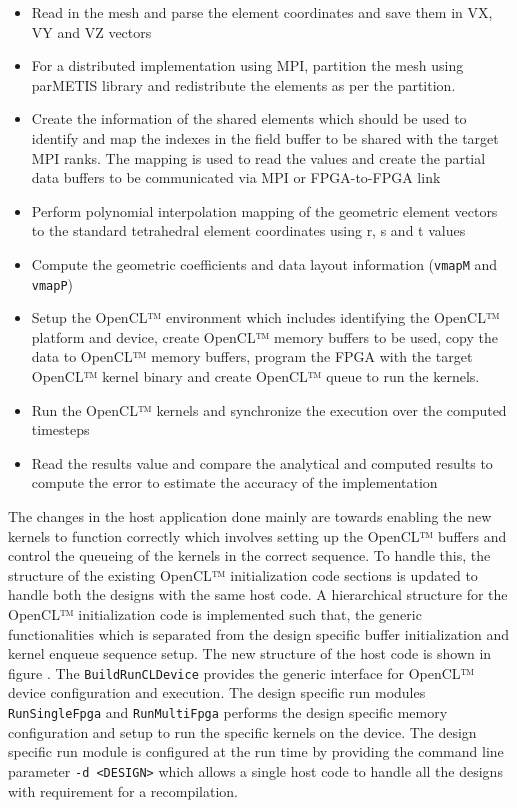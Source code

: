 \begin{itemize}
    \item Read in the mesh and parse the element coordinates and save them in VX, VY and VZ vectors
    \item For a distributed implementation using MPI, partition the mesh using parMETIS library
    and redistribute the elements as per the partition.
    \item Create the information of the shared elements which should be used to identify and map the
    indexes in the field buffer to be shared with the target MPI ranks. The mapping is used to read the
    values and create the partial data buffers to be communicated via MPI or FPGA-to-FPGA link
    \item Perform polynomial interpolation mapping of the geometric element vectors to the standard tetrahedral
    element coordinates using r, s and t values
    \item Compute the geometric coefficients and data layout information (\texttt{vmapM} and \texttt{vmapP})
    \item Setup the OpenCL™ environment which includes identifying the OpenCL™ platform and device,
    create OpenCL™ memory buffers to be used, copy the data to OpenCL™ memory buffers, program the FPGA with the
    target OpenCL™ kernel binary and create OpenCL™ queue to run the kernels.
    \item Run the OpenCL™ kernels and synchronize the execution over the computed timesteps
    \item Read the results value and compare the analytical and computed results to compute the error
    to estimate the accuracy of the implementation
\end{itemize}

The changes in the host application done mainly are towards enabling the new kernels to function correctly
which involves setting up the OpenCL™ buffers and control the queueing of the kernels in the correct sequence.
To handle this, the structure of the existing OpenCL™ initialization code sections is updated to handle
both the designs with the same host code. A hierarchical structure for the OpenCL™ initialization code
is implemented such that, the generic functionalities which is separated from the design specific buffer
initialization and kernel enqueue sequence setup. The new structure of the host code is shown
in figure . The \texttt{BuildRunCLDevice} provides the generic
interface for OpenCL™ device configuration and execution. The design specific run modules \texttt{RunSingleFpga} and
\texttt{RunMultiFpga} performs the design specific memory configuration and setup to run the specific kernels
on the device. The design specific run module is configured at the run time by providing the command line parameter
\texttt{-d <DESIGN>} which allows a single host code to handle all the designs with requirement for a recompilation.

